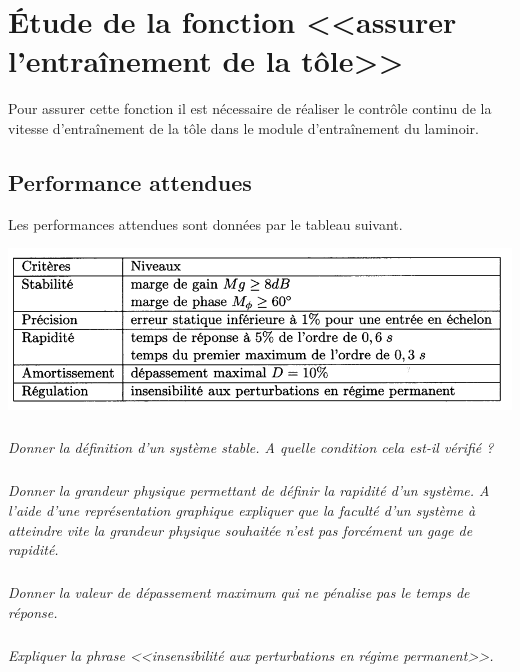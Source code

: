 \documentclass[11pt,oneside]{article}
\begin{document}
\section{Étude de la fonction <<assurer l'entraînement de la tôle>>}

Pour assurer cette fonction il est nécessaire de réaliser le contrôle continu de la vitesse d'entraînement de la tôle dans le module d'entraînement du laminoir.

\subsection{Performance attendues}

Les performances attendues sont données par le tableau suivant.

\begin{center}
\includegraphics[width=.75\textwidth]{png/figure_04}
\end{center}

\subparagraph{}
\textit{Donner la définition d'un système stable. A quelle condition cela est-il vérifié ?}


\subparagraph{}
\textit{Donner la grandeur physique permettant de définir la rapidité d'un système. A l'aide d'une représentation graphique expliquer que la faculté d’un système à atteindre vite la grandeur physique souhaitée n’est pas forcément un gage de rapidité.}


\subparagraph{}
\textit{Donner la valeur de dépassement maximum qui ne pénalise pas le temps de réponse.}


\subparagraph{}
\textit{Expliquer la phrase <<insensibilité aux perturbations en régime permanent>>.}
\end{document}
